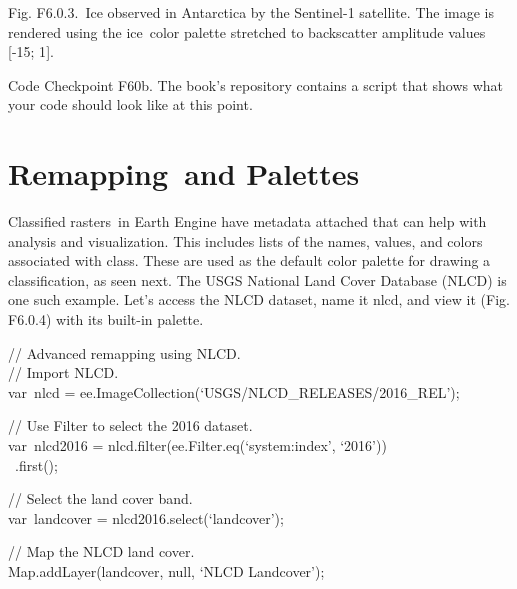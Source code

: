 \documentclass[
  letterpaper,
  DIV=11,
  numbers=noendperiod]{scrreprt}
\begin{document}
Fig. F6.0.3.~Ice observed in Antarctica by the Sentinel-1 satellite. The
image is rendered using the ice~color palette stretched to backscatter
amplitude values {[}-15; 1{]}.

\begin{tcolorbox}[enhanced jigsaw, left=2mm, breakable, rightrule=.15mm, opacityback=0, colframe=quarto-callout-note-color-frame, colbacktitle=quarto-callout-note-color!10!white, arc=.35mm, opacitybacktitle=0.6, toptitle=1mm, colback=white, leftrule=.75mm, title=\textcolor{quarto-callout-note-color}{\faInfo}\hspace{0.5em}{Note}, toprule=.15mm, bottomtitle=1mm, titlerule=0mm, bottomrule=.15mm, coltitle=black]

Code Checkpoint F60b. The book's repository contains a script that shows
what your code should look like at this point.

\end{tcolorbox}

\hypertarget{remapping-and-palettes}{%
\section{Remapping~and Palettes}\label{remapping-and-palettes}}

Classified rasters~in Earth Engine have metadata attached that can help
with analysis and visualization. This includes lists of the names,
values, and colors associated with class. These are used as the default
color palette for drawing a classification, as seen next. The USGS
National Land Cover Database (NLCD) is one such example. Let's access
the NLCD dataset, name it nlcd, and view it (Fig. F6.0.4) with its
built-in palette.

// Advanced remapping using NLCD.\\
// Import NLCD.\\
var~nlcd = ee.ImageCollection(`USGS/NLCD\_RELEASES/2016\_REL');

// Use Filter to select the 2016 dataset.\\
var~nlcd2016 = nlcd.filter(ee.Filter.eq(`system:index', `2016'))\\
\hspace*{0.333em} ~.first();

// Select the land cover band.\\
var~landcover = nlcd2016.select(`landcover');

// Map the NLCD land cover.\\
Map.addLayer(landcover, null, `NLCD Landcover');
\end{document}
